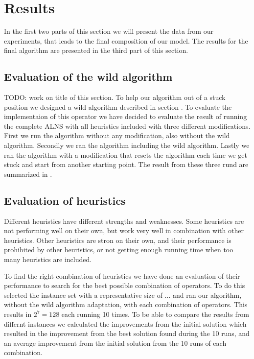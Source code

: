 \documentclass[../main.tex]{subfiles}
\begin{document}
\section{Results}
\label{sec:res}
In the first two parts of this section we will present the data from our experiments, that leads to the final composition of our model. The results for the final algorithm are presented in the third part of this section.

\subsection{Evaluation of the wild algorithm}
\label{sec:evalw}
TODO: work on title of this section.
To help our algorithm out of a stuck position we designed a wild algorithm described in section . To evaluate the implementaion of this operator we have decided to evaluate the result of running the complete ALNS with all heuristics included with three different modifications. 
First we run the algorithm without any modification, also without the wild algorithm. 
Secondly we ran the algorithm including the wild algorithm. 
Lastly we ran the algorithm with a modification that resets the algorithm each time we get stuck and start from another starting point. 
The result from these three rund are summarized in .

\subsection{Evaluation of heuristics}
\label{sec:evalh}
Different heuristics have different strengths and weaknesses. Some heuristics are not performing well on their own, but work very well in combination with other heuristics. 
Other heuristics are stron on their own, and their performance is prohibited by other heuristics, or not getting enough running time when too many heuristics are included.

\par To find the right combination of heuristics we have done an evaluation of their performance to search for the best possible combination of operators. To do this selected the instance set with a representative size of ... and ran our algorithm, without the wild algorithm adaptation, with each combination of operators.
This results in $2^7 = 128$ each running 10 times. To be able to compare the results from differnt instances we calculated the improvements from the initial solution which resulted in the improvement from the best solution found during the 10 runs, and an average improvement from the initial solution from the 10 runs of each combination.
\end{document}
